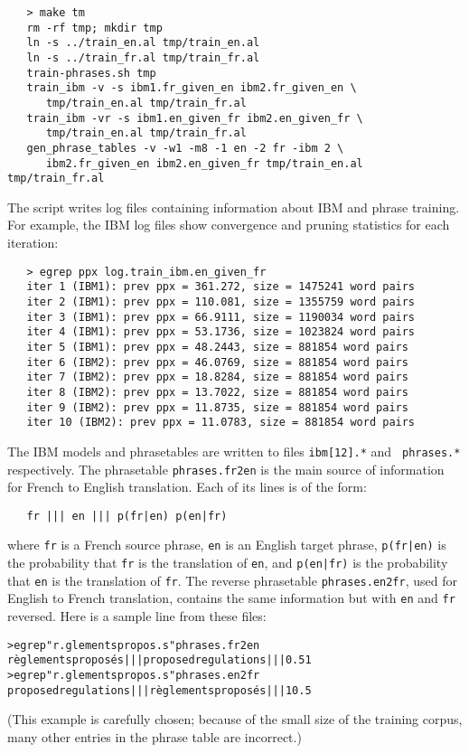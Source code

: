 \documentclass[11pt]{article}
\begin{document}
\begin{verbatim}
   > make tm
   rm -rf tmp; mkdir tmp
   ln -s ../train_en.al tmp/train_en.al
   ln -s ../train_fr.al tmp/train_fr.al
   train-phrases.sh tmp
   train_ibm -v -s ibm1.fr_given_en ibm2.fr_given_en \
      tmp/train_en.al tmp/train_fr.al
   train_ibm -vr -s ibm1.en_given_fr ibm2.en_given_fr \
      tmp/train_en.al tmp/train_fr.al
   gen_phrase_tables -v -w1 -m8 -1 en -2 fr -ibm 2 \
      ibm2.fr_given_en ibm2.en_given_fr tmp/train_en.al tmp/train_fr.al
\end{verbatim}
The script writes log files containing information about IBM and
phrase training. For example, the IBM log files show convergence and pruning
statistics for each iteration:
\begin{verbatim}
   > egrep ppx log.train_ibm.en_given_fr
   iter 1 (IBM1): prev ppx = 361.272, size = 1475241 word pairs
   iter 2 (IBM1): prev ppx = 110.081, size = 1355759 word pairs
   iter 3 (IBM1): prev ppx = 66.9111, size = 1190034 word pairs
   iter 4 (IBM1): prev ppx = 53.1736, size = 1023824 word pairs
   iter 5 (IBM1): prev ppx = 48.2443, size = 881854 word pairs
   iter 6 (IBM2): prev ppx = 46.0769, size = 881854 word pairs
   iter 7 (IBM2): prev ppx = 18.8284, size = 881854 word pairs
   iter 8 (IBM2): prev ppx = 13.7022, size = 881854 word pairs
   iter 9 (IBM2): prev ppx = 11.8735, size = 881854 word pairs
   iter 10 (IBM2): prev ppx = 11.0783, size = 881854 word pairs
\end{verbatim}

The IBM models and phrasetables are written to files {\tt ibm[12].*} and {\tt
  phrases.*} respectively. The phrasetable {\tt phrases.fr2en} is the main
source of information for French to English translation. Each of its lines is
of the form:
\begin{verbatim}
   fr ||| en ||| p(fr|en) p(en|fr)
\end{verbatim}
where {\tt fr} is a French source phrase, {\tt en} is an English target phrase,
{\tt p(fr|en)} is the probability that {\tt fr} is the translation of {\tt en}, and
{\tt p(en|fr)} is the probability that {\tt en} is the translation of {\tt fr}. The
reverse phrasetable {\tt phrases.en2fr}, used for English to French
translation, contains the same information but with {\tt en} and {\tt fr}
reversed. Here is a sample line from these files:
\begin{alltt}
   > egrep "r.glements propos.s" phrases.fr2en
   r{\`e}glements propos{\'e}s ||| proposed regulations ||| 0.5 1
   > egrep "r.glements propos.s" phrases.en2fr
   proposed regulations ||| r{\`e}glements propos{\'e}s ||| 1 0.5
\end{alltt}
(This example is carefully chosen; because of the small size of the training
corpus, many other entries in the phrase table are incorrect.)
\end{document}
